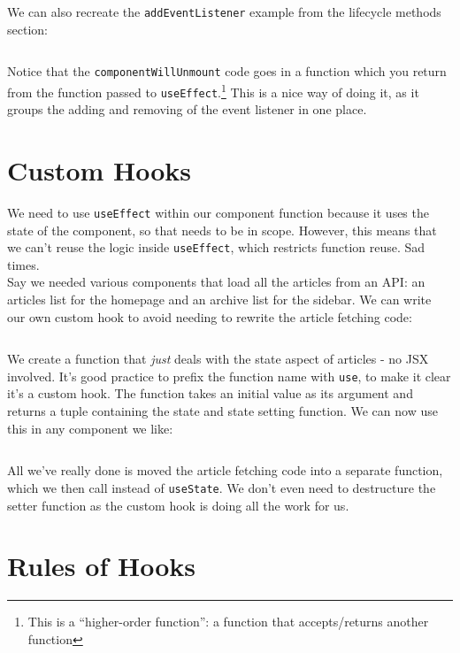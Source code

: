 \inputminted{javascript}{04-hooks/figures/11-StarWarsFolks.js}


We can also recreate the \texttt{addEventListener} example from the lifecycle methods section:


\inputminted{javascript}{04-hooks/figures/12-useEffect-return.js}

Notice that the \texttt{componentWillUnmount} code goes in a function which you return from the function passed to \texttt{useEffect}.\footnote{This is a ``higher-order function'': a function that accepts/returns another function} This is a nice way of doing it, as it groups the adding and removing of the event listener in one place.


\section{Custom Hooks}

We need to use \texttt{useEffect} within our component function because it uses the state of the component, so that needs to be in scope. However, this means that we can't reuse the logic inside \texttt{useEffect}, which restricts function reuse. Sad times.
\\

Say we needed various components that load all the articles from an API: an articles list for the homepage and an archive list for the sidebar. We can write our own custom hook to avoid needing to rewrite the article fetching code:

\inputminted{js}{04-hooks/figures/13-useGetArticles.js}

We create a function that \textit{just} deals with the state aspect of articles - no JSX involved. It's good practice to prefix the function name with \texttt{use}, to make it clear it's a custom hook. The function takes an initial value as its argument and returns a tuple containing the state and state setting function. We can now use this in any component we like:

\inputminted{js}{04-hooks/figures/14-Articles.js}

All we've really done is moved the article fetching code into a separate function, which we then call instead of \texttt{useState}. We don't even need to destructure the setter function as the custom hook is doing all the work for us.

\section{Rules of Hooks}


